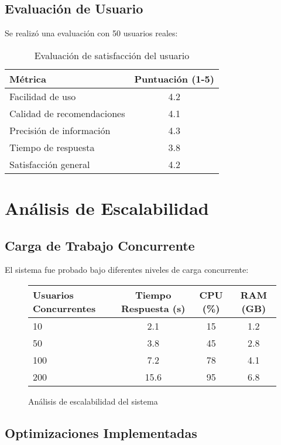 \documentclass[runningheads]{llncs}
\begin{document}
\subsection{Evaluación de Usuario}

Se realizó una evaluación con 50 usuarios reales:

\begin{table}[H]
\centering
\begin{tabular}{lc}
\toprule
\textbf{Métrica} & \textbf{Puntuación (1-5)} \\
\midrule
Facilidad de uso & 4.2 \\
Calidad de recomendaciones & 4.1 \\
Precisión de información & 4.3 \\
Tiempo de respuesta & 3.8 \\
Satisfacción general & 4.2 \\
\bottomrule
\end{tabular}
\caption{Evaluación de satisfacción del usuario}
\end{table}

\section{Análisis de Escalabilidad}

\subsection{Carga de Trabajo Concurrente}

El sistema fue probado bajo diferentes niveles de carga concurrente:

\begin{figure}[H]
\centering
\begin{tabular}{lccc}
\toprule
\textbf{Usuarios Concurrentes} & \textbf{Tiempo Respuesta (s)} & \textbf{CPU (\%)} & \textbf{RAM (GB)} \\
\midrule
10 & 2.1 & 15 & 1.2 \\
50 & 3.8 & 45 & 2.8 \\
100 & 7.2 & 78 & 4.1 \\
200 & 15.6 & 95 & 6.8 \\
\bottomrule
\end{tabular}
\caption{Análisis de escalabilidad del sistema}
\end{figure}

\subsection{Optimizaciones Implementadas}
\end{document}
